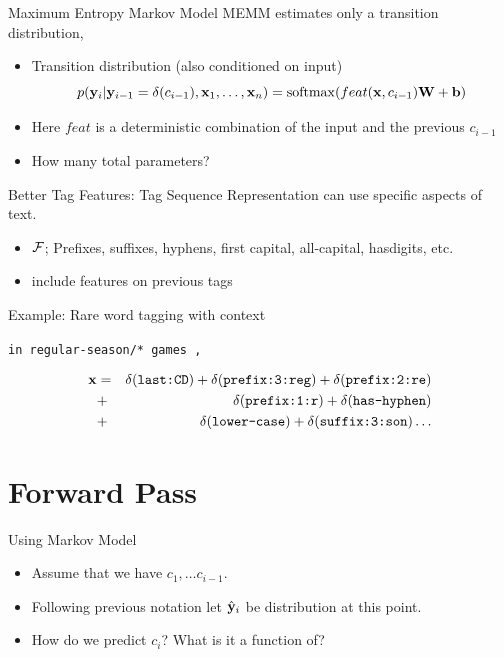 \documentclass{beamer}
\begin{document}
\begin{frame}{Maximum Entropy Markov Model}
  MEMM estimates only a transition distribution,
  \begin{itemize}
  \item Transition distribution (also conditioned on input)
    \[p(\boldy_i | \boldy_{i-1}=\delta(c_{i-1}), \boldx_1, \ldots, \boldx_n) = \softmax(feat(\boldx, c_{i-1}) \boldW + \boldb) \]

  \item Here $feat$ is a deterministic combination of the input and the previous $c_{i-1}$   
  \end{itemize}
  \begin{itemize}
  \item How many total parameters?
  \end{itemize}
\end{frame}

\begin{frame}{Better Tag Features: Tag Sequence}
  Representation can use specific aspects of text.
  \begin{itemize}
  \item $\mathcal{F}$; Prefixes, suffixes, hyphens, first capital, all-capital, hasdigits, etc.
  \item {} include features on previous tags
  \end{itemize}

  Example: Rare word tagging with context

  \begin{center}
    \texttt{in  \alert{regular-season/*} games ,}
  \end{center}
  \begin{eqnarray*}
    \mathbf{x} &=& \delta(\texttt{last:CD}) + \delta(\texttt{prefix:3:reg}) + \delta(\texttt{prefix:2:re}) \\
    &+& \delta(\texttt{prefix:1:r}) + \delta(\texttt{has-hyphen}) \\
    &+& \delta(\texttt{lower-case}) + \delta(\texttt{suffix:3:son}) \ldots
  \end{eqnarray*}
\end{frame}


\section{Forward Pass}

\begin{frame}{Using Markov Model}
  \begin{itemize}
  \item Assume that we have $c_1, \ldots c_{i-1}$.
    \air 
  \item Following previous notation let $\hat{\mathbf{y}}_i$ be distribution at this point.
    \air 

  \item How do we predict $c_i$? What is it a function of?
  \end{itemize}
\end{frame}
\end{document}
